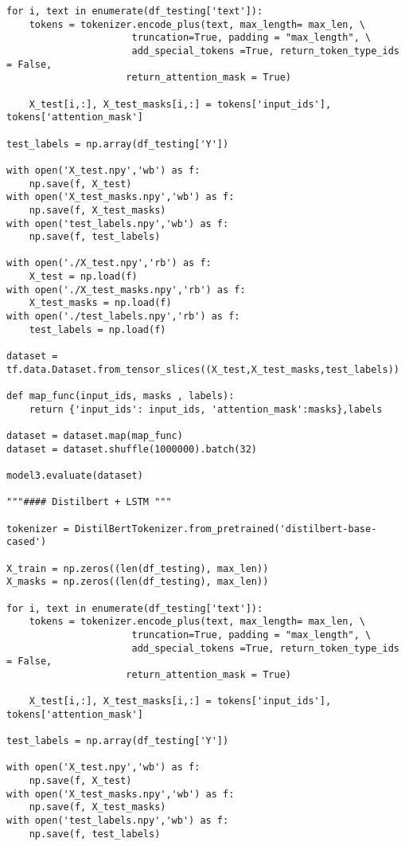 \documentclass[10pt,riqno,a4paper,twoside]{article}\usepackage[]{graphicx}\usepackage[]{color}
\begin{document}
\begin{lstlisting}
for i, text in enumerate(df_testing['text']):
    tokens = tokenizer.encode_plus(text, max_length= max_len, \
                      truncation=True, padding = "max_length", \
                      add_special_tokens =True, return_token_type_ids = False,
                     return_attention_mask = True)
    
    X_test[i,:], X_test_masks[i,:] = tokens['input_ids'], tokens['attention_mask']
    
test_labels = np.array(df_testing['Y'])

with open('X_test.npy','wb') as f:
    np.save(f, X_test)
with open('X_test_masks.npy','wb') as f:
    np.save(f, X_test_masks)
with open('test_labels.npy','wb') as f:
    np.save(f, test_labels)

with open('./X_test.npy','rb') as f:
    X_test = np.load(f)
with open('./X_test_masks.npy','rb') as f:
    X_test_masks = np.load(f)
with open('./test_labels.npy','rb') as f:
    test_labels = np.load(f)

dataset = tf.data.Dataset.from_tensor_slices((X_test,X_test_masks,test_labels))

def map_func(input_ids, masks , labels):
    return {'input_ids': input_ids, 'attention_mask':masks},labels

dataset = dataset.map(map_func)
dataset = dataset.shuffle(1000000).batch(32)

model3.evaluate(dataset)

"""#### Distilbert + LSTM """

tokenizer = DistilBertTokenizer.from_pretrained('distilbert-base-cased')

X_train = np.zeros((len(df_testing), max_len))
X_masks = np.zeros((len(df_testing), max_len))

for i, text in enumerate(df_testing['text']):
    tokens = tokenizer.encode_plus(text, max_length= max_len, \
                      truncation=True, padding = "max_length", \
                      add_special_tokens =True, return_token_type_ids = False,
                     return_attention_mask = True)
    
    X_test[i,:], X_test_masks[i,:] = tokens['input_ids'], tokens['attention_mask']
    
test_labels = np.array(df_testing['Y'])

with open('X_test.npy','wb') as f:
    np.save(f, X_test)
with open('X_test_masks.npy','wb') as f:
    np.save(f, X_test_masks)
with open('test_labels.npy','wb') as f:
    np.save(f, test_labels)


\end{lstlisting}
\end{document}
